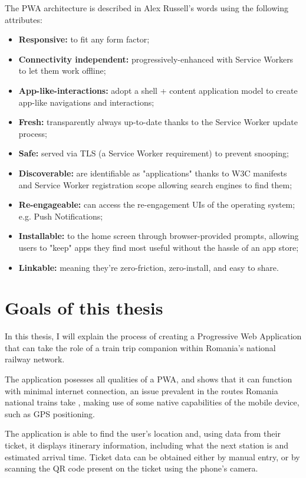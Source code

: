 The PWA architecture is described in Alex Russell's words using the following attributes: \cite{PWAShortHist}
\begin{itemize}
    \item \textbf{Responsive:} to fit any form factor;
    \item \textbf{Connectivity independent:} progressively-enhanced with Service Workers to let them work offline;
    \item \textbf{App-like-interactions:} adopt a shell + content application model to create app-like navigations and interactions;
    \item \textbf{Fresh:} transparently always up-to-date thanks to the Service Worker update process;
    \item \textbf{Safe:} served via TLS (a Service Worker requirement) to prevent snooping;
    \item \textbf{Discoverable:} are identifiable as "applications" thanks to W3C manifests and Service Worker registration scope allowing search engines to find them;
    \item \textbf{Re-engageable:} can access the re-engagement UIs of the operating system; e.g. Push Notifications;
    \item \textbf{Installable:} to the home screen through browser-provided prompts, allowing users to "keep" apps they find most useful without the hassle of an app store;
    \item \textbf{Linkable:} meaning they're zero-friction, zero-install, and easy to share.
\end{itemize}

\section{Goals of this thesis}

In this thesis, I will explain the process of creating a Progressive Web Application that can take the role of a train trip companion within Romania's national railway network.

The application posesses all qualities of a PWA, and shows that it can function with minimal internet connection, an issue prevalent in the routes Romania national trains take \cite{CFRInternetIC}, making use of some native capabilities of the mobile device, such as GPS positioning.

The application is able to find the user's location and, using data from their ticket, it displays itinerary information, including what the next station is and estimated arrival time. Ticket data can be obtained either by manual entry, or by scanning the QR code present on the ticket using the phone's camera.

